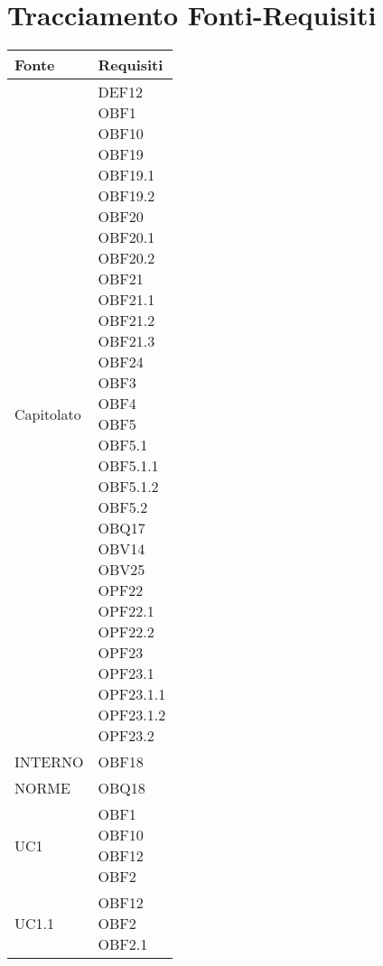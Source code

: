 \documentclass{scalatekids-article}
\begin{document}
\section{Tracciamento Fonti-Requisiti}
\begin{longtable}[H]{|p{5.5cm}|p{5.5cm}|}
  \hline
  \textbf{Fonte} & \textbf{Requisiti}\\
  \hline
  Capitolato & \multiLineCell[t]{DEF12\\OBF1\\OBF10\\OBF19\\OBF19.1\\OBF19.2\\OBF20\\OBF20.1\\OBF20.2\\OBF21\\OBF21.1\\OBF21.2\\OBF21.3\\OBF24\\OBF3\\OBF4\\OBF5\\OBF5.1\\OBF5.1.1\\OBF5.1.2\\OBF5.2\\OBQ17\\OBV14\\OBV25\\OPF22\\OPF22.1\\OPF22.2\\OPF23\\OPF23.1\\OPF23.1.1\\OPF23.1.2\\OPF23.2\\}\\
  \hline
  INTERNO & \multiLineCell[t]{OBF18\\}\\
  \hline
  NORME & \multiLineCell[t]{OBQ18\\}\\
  \hline
  UC1 & \multiLineCell[t]{OBF1\\OBF10\\OBF12\\OBF2\\}\\
  \hline
  UC1.1 & \multiLineCell[t]{OBF12\\OBF2\\OBF2.1\\}\\

\end{longtable}
\end{document}
